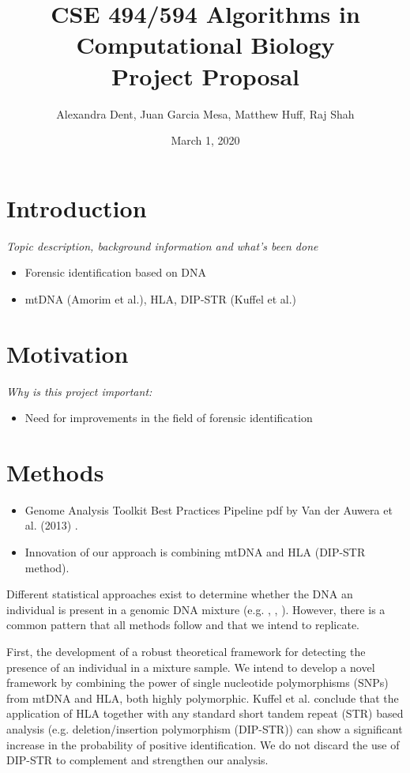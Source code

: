 \documentclass[10pt]{article}
\title{CSE 494/594 Algorithms in Computational Biology \\
		Project Proposal}
\author{Alexandra Dent, Juan Garcia Mesa, Matthew Huff, Raj Shah}
\date{March 1, 2020}
\begin{document}
\maketitle

\section{Introduction}
\textit{Topic description, background information and what's been done}

\begin{itemize}
	\item Forensic identification based on DNA
	\item mtDNA (Amorim et al.), HLA, DIP-STR (Kuffel et al.) 
\end{itemize}

\section{Motivation}
\textit{Why is this project important:}

\begin{itemize}
	\item Need for improvements in the field of forensic identification
\end{itemize}



\section{Methods}

\begin{itemize}
	\item Genome Analysis Toolkit Best Practices Pipeline pdf by Van der Auwera et al. (2013) \cite{Auwera2013}.
	\item Innovation of our approach is combining mtDNA and HLA (DIP-STR method).
\end{itemize}

Different statistical approaches exist to determine whether the DNA an individual is present in a genomic DNA mixture (e.g. \cite{Cowell2015}, \cite{Homer2008}, \cite{Vohr2015}). However, there is a common pattern that all methods follow and that we intend to replicate. 

First, the development of a robust theoretical framework for detecting the presence of an individual in a mixture sample. We intend to develop a novel framework by combining the power of single nucleotide polymorphisms (SNPs) from mtDNA and HLA, both highly polymorphic. Kuffel et al. \cite{Kuffel2019} conclude that the application of HLA together with any standard short tandem repeat (STR) based analysis (e.g. deletion/insertion polymorphism (DIP-STR)) can show a significant increase in the probability of positive identification. We do not discard the use of DIP-STR to complement and strengthen our analysis.
\end{document}
